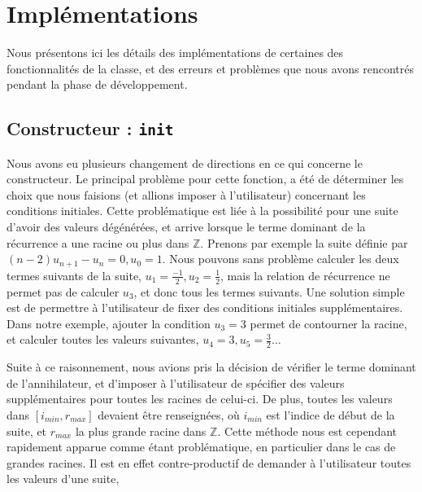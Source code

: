 \documentclass[12pt]{article}
\newlength{\charwidth}
\newcommand{\uline}{\underline{\hspace{2\charwidth}}}
\begin{document}

\section{Implémentations}
    Nous présentons ici les détails des implémentations de certaines des fonctionnalités
    de la classe, et des erreurs et problèmes que nous avons rencontrés pendant la
    phase de développement.
    \subsection{Constructeur : \texttt{\uline init\uline}}
        \label{sec:cons}
        Nous avons eu plusieurs changement de directions en ce qui concerne le constructeur.
        Le principal problème pour cette fonction, a été de déterminer les choix que nous
        faisions (et allions imposer à l'utilisateur) concernant les conditions initiales.
        Cette problématique est liée à la possibilité pour une suite d'avoir des
        valeurs dégénérées, et arrive lorsque le terme dominant de la récurrence 
        a une racine ou plus dans $\mathbb Z$. Prenons par exemple la suite
        définie par $(n-2)u_{n+1} - u_n = 0, u_0 = 1$. Nous pouvons sans problème calculer
        les deux termes suivants de la suite, $u_1 = \frac{-1}{2}, u_2 = \frac{1}{2}$,
        mais la relation de récurrence ne permet pas de calculer $u_3$, et donc tous les termes suivants.
        Une solution simple est de permettre à l'utilisateur de fixer des conditions initiales
        supplémentaires. Dans notre exemple, ajouter la condition $u_3 = 3$ permet de
        contourner la racine, et calculer toutes les valeurs suivantes, $u_4 = 3,u_5=\frac{3}{2}\ldots$
        \par Suite à ce raisonnement, nous avions pris la décision de vérifier le terme
        dominant de l'annihilateur, et d'imposer à l'utilisateur de spécifier des 
        valeurs supplémentaires pour toutes les racines de celui-ci. De plus,
        toutes les valeurs dans $[i_{min},r_{max}]$ devaient être renseignées,
        où $i_{min}$ est l'indice de début de la suite, et $r_{max}$ la plus grande racine 
        dans $\mathbb Z$. Cette méthode nous est cependant rapidement apparue comme étant
        problématique, en particulier dans le cas de grandes racines. Il est en effet
        contre-productif de demander à l'utilisateur toutes les valeurs d'une suite,
\end{document}
